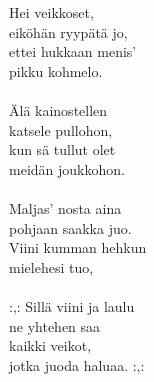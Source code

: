 
Hei veikkoset, \\ eiköhän ryypätä jo, \\ ettei hukkaan menis' \\ pikku kohmelo. \\ \hspace{10mm} \\ Älä kainostellen \\ katsele pullohon, \\ kun sä tullut olet \\ meidän joukkohon. \\ \hspace{10mm} \\ Maljas' nosta aina \\ pohjaan saakka juo. \\ Viini kumman hehkun \\ mielehesi tuo, \\ \hspace{10mm} \\ :,: Sillä viini ja laulu \\ ne yhtehen saa \\ kaikki veikot, \\ jotka juoda haluaa. :,: